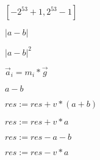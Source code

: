 \documentclass{article}
\begin{document}
$[-2^{53}+1, 2^{53}-1]$
\pagebreak

$|a-b|$
\pagebreak

$|a-b|^2$
\pagebreak

$\vec a_i = m_i * \vec g $
\pagebreak

$a-b$
\pagebreak

$ res := res + v*(a+b)$
\pagebreak

$ res := res + v*a$
\pagebreak

$ res := res - a - b$
\pagebreak

$ res := res - v*a$
\pagebreak
\end{document}
